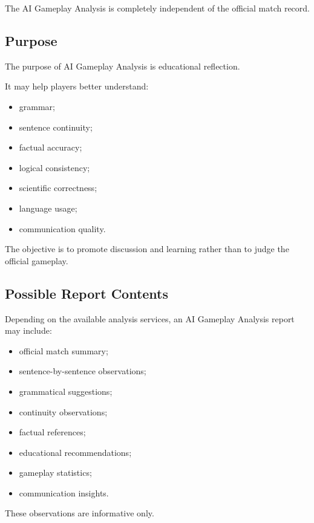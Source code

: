 \documentclass[11pt,a4paper]{article}
\begin{document}
The AI Gameplay Analysis is completely independent of the official match record.

\subsection{Purpose}

The purpose of AI Gameplay Analysis is educational reflection.

It may help players better understand:

\begin{itemize}
    \item grammar;
    \item sentence continuity;
    \item factual accuracy;
    \item logical consistency;
    \item scientific correctness;
    \item language usage;
    \item communication quality.
\end{itemize}

The objective is to promote discussion and learning rather than to judge the official gameplay.

\subsection{Possible Report Contents}

Depending on the available analysis services, an AI Gameplay Analysis report may include:

\begin{itemize}
    \item official match summary;
    \item sentence-by-sentence observations;
    \item grammatical suggestions;
    \item continuity observations;
    \item factual references;
    \item educational recommendations;
    \item gameplay statistics;
    \item communication insights.
\end{itemize}

These observations are informative only.
\end{document}
